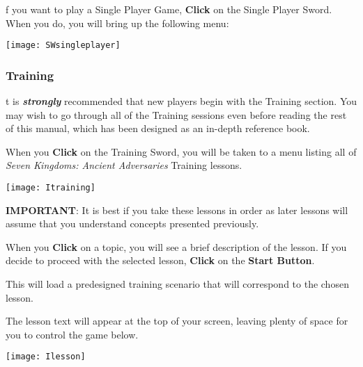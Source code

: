 
f you want to play a Single Player Game, \textbf{Click} on the Single Player Sword. When you do, you will bring up the following menu: 

\begin{center}
	\texttt{[image: SWsingleplayer]} %
\end{center}

\subsubsection{\textsf{Training}}



t is \textbf{\textit{strongly}} recommended that new players begin with the Training section. You may wish to go through all of the Training sessions even before reading the rest of this manual, which has been designed as an in-depth reference book.

When you \textbf{Click} on the Training Sword, you will be taken to a menu listing all of \textit{Seven Kingdoms: Ancient Adversaries} Training lessons.


\begin{center}
    \texttt{[image: Itraining]} %
\end{center}


\textbf{IMPORTANT}: It is best if you take these lessons in order as later lessons will assume that you understand concepts presented previously.

When you \textbf{Click} on a topic, you will see a brief description of the lesson. If you decide to proceed with the selected lesson, \textbf{Click} on the \textbf{Start Button}.

This will load a predesigned training scenario that will correspond to the chosen lesson.

The lesson text will appear at the top of your screen, leaving plenty of space for you to control the game below.

\begin{center}
    \texttt{[image: Ilesson]} %
\end{center}

